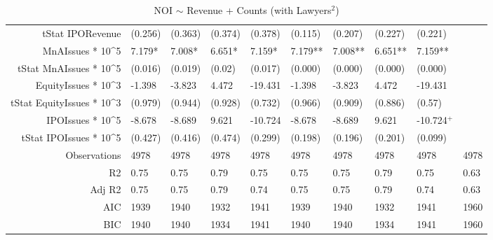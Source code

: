 \begin{table}[ht]
\begin{tabular}{rlllllllll}
  tStat IPORevenue & (0.256) & (0.363) & (0.374) & (0.378) & (0.115) & (0.207) & (0.227) & (0.221) &  \\ 
  MnAIssues * 10^5 & 7.179* & 7.008* & 6.651* & 7.159* & 7.179** & 7.008** & 6.651** & 7.159** &  \\ 
  tStat MnAIssues * 10^5 & (0.016) & (0.019) & (0.02) & (0.017) & (0.000) & (0.000) & (0.000) & (0.000) &  \\ 
  EquityIssues * 10^3 & -1.398 & -3.823 & 4.472 & -19.431 & -1.398 & -3.823 & 4.472 & -19.431 &  \\ 
  tStat EquityIssues * 10^3 & (0.979) & (0.944) & (0.928) & (0.732) & (0.966) & (0.909) & (0.886) & (0.57) &  \\ 
  IPOIssues * 10^5 & -8.678 & -8.689 & 9.621 & -10.724 & -8.678 & -8.689 & 9.621 & -10.724$^{+}$ &  \\ 
  tStat IPOIssues * 10^5 & (0.427) & (0.416) & (0.474) & (0.299) & (0.198) & (0.196) & (0.201) & (0.099) &  \\ 
  Observations & 4978 & 4978 & 4978 & 4978 & 4978 & 4978 & 4978 & 4978 & 4978 \\ 
  R2 & 0.75 & 0.75 & 0.79 & 0.75 & 0.75 & 0.75 & 0.79 & 0.75 & 0.63 \\ 
  Adj R2 & 0.75 & 0.75 & 0.79 & 0.74 & 0.75 & 0.75 & 0.79 & 0.74 & 0.63 \\ 
  AIC & 1939 & 1940 & 1932 & 1941 & 1939 & 1940 & 1932 & 1941 & 1960 \\ 
  BIC & 1940 & 1940 & 1934 & 1941 & 1940 & 1940 & 1934 & 1941 & 1960 \\ 
   \hline
\end{tabular}
\caption{NOI $\sim$ Revenue + Counts (with Lawyers$^2$)} 
\end{table}
